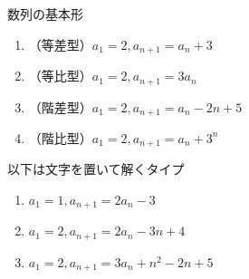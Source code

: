 \documentclass[12pt,a4paper]{jsarticle}
\begin{document}
数列の基本形
\begin{enumerate}
    \item （等差型）$a_1=2, a_{n+1}=a_n +3$
    \item （等比型）$a_1=2, a_{n+1}=3 a_n$
    \item （階差型）$a_1=2, a_{n+1}=a_n -2n+5$
    \item （階比型）$a_1=2, a_{n+1}=a_n +3^n$
\end{enumerate}
以下は文字を置いて解くタイプ
\begin{enumerate}
    \item $a_1=1, a_{n+1}=2 a_n -3$
    \item $a_1=2, a_{n+1}=2 a_n -3n+4$
    \item $a_1=2, a_{n+1}=3a_n+n^2 -2n +5$
\end{enumerate}
\end{document}

